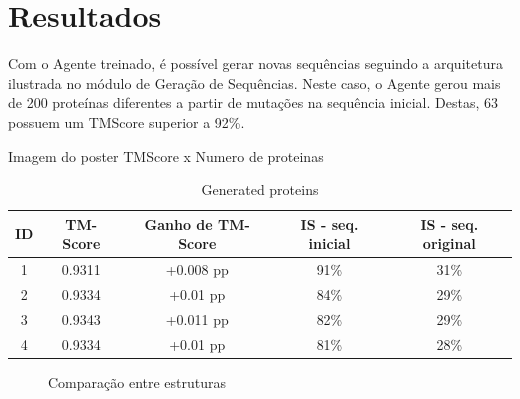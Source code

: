\chapter{Resultados}

Com o Agente treinado, é possível gerar novas sequências seguindo a arquitetura ilustrada no módulo de Geração de Sequências.
Neste caso, o Agente gerou mais de 200 proteínas diferentes a partir de mutações na sequência inicial. Destas, 63 possuem um TMScore superior a 92\%.

{\color{red} Imagem do poster TMScore x Numero de proteinas}




\begin{table}[htbp]
    \centering
    \begin{tabular}{c|cccc}
        \hline
        \textbf{ID} & \textbf{TM-Score} & \textbf{Ganho de TM-Score} & \textbf{IS - seq. inicial} & \textbf{IS - seq. original} \\
        \hline
         1 & 0.9311 & +0.008 pp & 91\% & 31\% \\
         2 & 0.9334 & +0.01 pp & 84\% & 29\% \\
         3 & 0.9343 & +0.011 pp & 82\% & 29\% \\
         4 & 0.9334 & +0.01 pp & 81\% & 28\% \\
        \hline
    \end{tabular}
    \caption{Generated proteins}
    \label{tab:tabela_exemplo}
\end{table}

\begin{figure}%
    \centering
    \qquad
    \caption{Comparação entre estruturas}%
    \label{fig:example}%
\end{figure}

